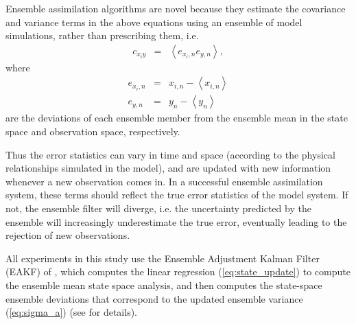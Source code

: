 Ensemble assimilation algorithms are novel because they estimate the covariance and variance terms in the above equations using an ensemble of model simulations, rather than prescribing them, i.e. 
\begin{eqnarray}
c_{x_iy} &=& 
\left<
e_{{x_i},n} 
e_{{y},n}
\right>,
\label{eq:covariance} 
\end{eqnarray}
%
%
%
where 
\begin{eqnarray}
	e_{{x_i},n} &=& x_{i,n} - \left< x_{i,n} \right>   \label{eq:exn} \\
	e_{y,n} &=& y_{n} - \left< y_{n} \right>    \label{eq:eyn}
\end{eqnarray}
are the deviations of each ensemble member from the ensemble mean in the state space and observation space, respectively.

Thus the error statistics can vary in time and space (according to the physical relationships simulated in the model), and are updated with new information whenever a new observation comes in.  
In a successful ensemble assimilation system, these terms should reflect the true error statistics of the model system.
If not, the ensemble filter will diverge, i.e. the uncertainty predicted by the ensemble will increasingly underestimate the true error, eventually leading to the rejection of new observations.

All experiments in this study use the Ensemble Adjustment Kalman Filter (EAKF) of \citet{anderson2001}, which computes the linear regression (\ref{eq:state_update}) to compute the ensemble mean state space analysis, and then computes the state-space ensemble deviations that correspond to the updated ensemble variance (\ref{eq:sigma_a}) (see \citet{Anderson2003} for details). 
